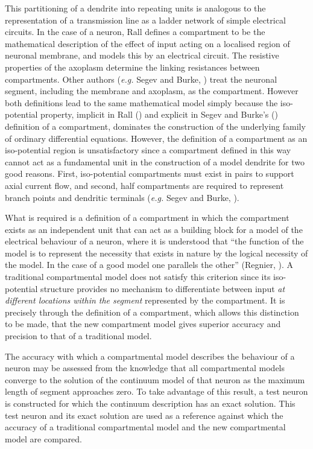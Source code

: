 This partitioning of a dendrite into repeating units is analogous
to the representation of a transmission line as a ladder network
of simple electrical circuits. In the case of a neuron, Rall
defines a compartment to be the mathematical description of the
effect of input acting on a localised region of neuronal membrane,
and models this by an electrical circuit. The resistive properties
of the axoplasm determine the linking resistances between
compartments. Other authors (\emph{e.g.} Segev and Burke,
\cite{Segev98}) treat the neuronal segment, including the membrane
and axoplasm, as the compartment. However both definitions lead to
the same mathematical model simply because the iso-potential
property, implicit in Rall (\cite{Rall64}) and explicit in Segev
and Burke's (\cite{Segev98}) definition of a compartment,
dominates the construction of the underlying family of ordinary
differential equations. However, the definition of a compartment
as an iso-potential region is unsatisfactory since a compartment
defined in this way cannot act as a fundamental unit in the
construction of a model dendrite for two good reasons. First,
iso-potential compartments must exist in pairs to support axial
current flow, and second, half compartments are required to
represent branch points and dendritic terminals (\emph{e.g.} Segev
and Burke, \cite{Segev98}).

What is required is a definition of a compartment in which the
compartment exists as an independent unit that can act as a
building block for a model of the electrical behaviour of a
neuron, where it is understood that ``the function of the model is
to represent the necessity that exists in nature by the logical
necessity of the model. In the case of a good model one parallels
the other'' (Regnier, \cite{Regnier64}).  A traditional
compartmental model does not satisfy this criterion since its
iso-potential structure provides no mechanism to differentiate
between input \emph{at different locations within the segment}
represented by the compartment. It is precisely through the
definition of a compartment, which allows this distinction to be
made, that the new compartment model gives superior accuracy and
precision to that of a traditional model.

The accuracy with which a compartmental model describes the
behaviour of a neuron may be assessed from the knowledge that all
compartmental models converge to the solution of the continuum
model of that neuron as the maximum length of segment approaches
zero. To take advantage of this result, a test neuron is
constructed for which the continuum description has an exact
solution. This test neuron and its exact solution are used as a
reference against which the accuracy of a traditional
compartmental model and the new compartmental model are compared.

